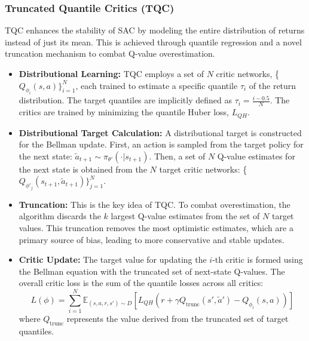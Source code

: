 \subsubsection{Truncated Quantile Critics (TQC)}
TQC enhances the stability of SAC by modeling the entire distribution of returns instead of just its mean. This is achieved through quantile regression and a novel truncation mechanism to combat Q-value overestimation.

\begin{itemize}
    \item \textbf{Distributional Learning:} TQC employs a set of $N$ critic networks, \{$Q_{\phi_i}(s, a)\}_{i=1}^{N}$, each trained to estimate a specific quantile $\tau_i$ of the return distribution. The target quantiles are implicitly defined as $\tau_i = \frac{i-0.5}{N}$. The critics are trained by minimizing the quantile Huber loss, $L_{QH}$.
    
    \item \textbf{Distributional Target Calculation:} A distributional target is constructed for the Bellman update. First, an action is sampled from the target policy for the next state: $\tilde{a}_{t+1} \sim \pi_{\theta'}(\cdot|s_{t+1})$. Then, a set of $N$ Q-value estimates for the next state is obtained from the $N$ target critic networks: \{$Q_{\phi'_j}(s_{t+1}, \tilde{a}_{t+1})\}_{j=1}^{N}$.
    
    \item \textbf{Truncation:} This is the key idea of TQC. To combat overestimation, the algorithm discards the $k$ largest Q-value estimates from the set of $N$ target values. This truncation removes the most optimistic estimates, which are a primary source of bias, leading to more conservative and stable updates.
    
    \item \textbf{Critic Update:} The target value for updating the $i$-th critic is formed using the Bellman equation with the truncated set of next-state Q-values. The overall critic loss is the sum of the quantile losses across all critics:
    \[
    L(\phi) = \sum_{i=1}^{N} \mathbb{E}_{(s,a,r,s') \sim D} \left[ L_{QH}\left(r + \gamma Q_{\text{trunc}}(s', \tilde{a}') - Q_{\phi_i}(s,a) \right) \right]
    \]
    where $Q_{\text{trunc}}$ represents the value derived from the truncated set of target quantiles.
\end{itemize}








